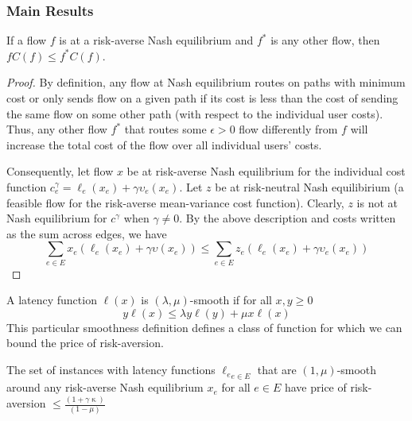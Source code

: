 \subsubsection{Main Results}
\begin{theorem}
    If a flow $f$ is at a risk-averse Nash equilibrium and $f^*$ is any other flow, then $fC(f)\leq f^*C(f)$. 
    \label{variational}
\end{theorem}

\begin{proof}
    By definition, any flow at Nash equilibrium routes on paths with minimum cost or only sends flow on a given path if its cost is less than
    the cost of sending the same flow on some other path (with respect to the individual user costs). 
    Thus, any other flow $f^*$ that routes some $\epsilon > 0$ flow differently from $f$ will increase the total cost of the flow over all individual users' costs.

    Consequently, let flow $x$ be at risk-averse Nash equilibrium for the individual cost function $c^\gamma_e = \ell_e(x_e) +\gamma \upsilon_e(x_e)$. Let $z$ be at risk-neutral Nash equilibirium (a feasible flow for the risk-averse mean-variance cost function). 
    Clearly, $z$ is not at Nash equilibrium for $c^\gamma$ when $\gamma \neq 0$. 
    By the above description and costs written as the sum across edges, we have
    $$\sum_{e \in E}x_e(\ell_e(x_e) + \gamma \upsilon(x_e)) \leq \sum_{e \in E} z_e(\ell_e(x_e) + \gamma \upsilon_e(x_e))$$
\end{proof}

\begin{definition}
    A latency function $\ell(x)$ is $(\lambda, \mu)$-smooth if for all $x, y \geq 0$ $$ y\ell(x) \leq \lambda y\ell(y) + \mu x \ell(x)$$
    This particular smoothness definition defines a class of function for which we can bound the price of risk-aversion.
\end{definition}

\begin{theorem}
    The set of instances with latency functions ${\ell_e}_{e \in E}$ that are $(1,\mu)$-smooth around any risk-averse Nash equilibrium $x_e$ for all $e \in E$ have price of risk-aversion
    $\leq \displaystyle \frac{(1 + \gamma \upkappa)}{(1 - \mu)}$
\end{theorem}

